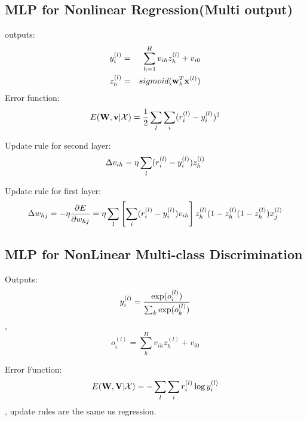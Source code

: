     \subsection{MLP for Nonlinear Regression(Multi output)} 
        outputs: 
        \begin{eqnarray*}
            y^{(l)}_i &=& \sum_{h=1}^H v_{ih} z_h^{(l)} + v_{i0} \\
             z_h^{(l)} &=& sigmoid(\mathbf{w}_h^T\mathbf{x}^{(l)})
         \end{eqnarray*}
        Error function: \[E(\mathbf{W}, \mathbf{v}|\mathcal{X}) = \frac{1}{2}\sum_l\sum_i(r^{(l)}_i -
        y^{(l)}_i)^2\]

        Update rule for second layer: \[\Delta v_{ih} = \eta \sum_l(r^{(l)}_i - y^{(l)}_i)
        z_h^{(l)}\]

        Update rule for first layer: 
        \[
        \Delta w_{hj} = -\eta \frac{\partial
        E}{\partial w_{hj}} =\\ \eta \sum_l\left[\sum_i(r^{(l)}_i -
        y^{(l)}_i)v_{ih}\right]z_h^{(l)}(1-z_h^{(l)}(1-z_h^{(l)})x_j^{(l)}\]

    \subsection{MLP for NonLinear Multi-class Discrimination}
        Outputs: \[y^{(l)}_i = \frac{\exp(o_i^{(l)})}{\sum_k \exp(o_k^{(l)})}\],
        \[o_i^{(l)} = \sum_h^Hv_{ih}z_h^{(l)} + v_{i0}\]


        Error Function: \[E(\mathbf{W}, \mathbf{V}|\mathcal{X}) = -\sum_l\sum_i
        r_i^{(l)}\log y^{(l)}_i\], update rules are the same us regression.


